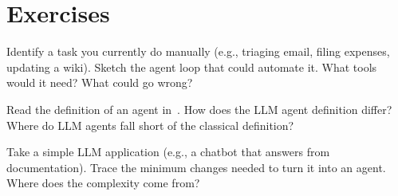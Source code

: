 \section{Exercises}

\begin{exercise}
	Identify a task you currently do manually (e.g., triaging email, filing expenses, updating a wiki). Sketch the agent loop that could automate it. What tools would it need? What could go wrong?
\end{exercise}

\begin{exercise}
	Read the definition of an agent in~\cite{russell2016aima}. How does the LLM agent definition differ? Where do LLM agents fall short of the classical definition?
\end{exercise}

\begin{exercise}
	Take a simple LLM application (e.g., a chatbot that answers from documentation). Trace the minimum changes needed to turn it into an agent. Where does the complexity come from?
\end{exercise}
